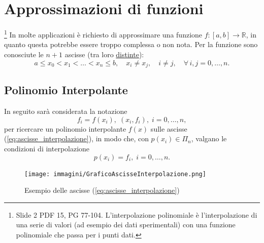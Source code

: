 \section{Approssimazioni di funzioni}
\footnote{Slide 2 PDF 15, PG 77-104. L'interpolazione polinomiale è l'interpolazione di una serie di valori (ad esempio dei dati sperimentali) con una funzione polinomiale che passa per i punti dati.}
In molte applicazioni è richiesto di approssimare una funzione $f:[a,b]\rightarrow\mathbb R$, in quanto questa potrebbe essere troppo complessa o non nota. Per la funzione sono conosciute le $n+1$ ascisse (tra loro \underline{distinte}):
\begin{equation}\label{eq:ascisse_interpolazione}
	a\leq x_0<x_1<\hdots<x_n\leq b,\quad x_i\neq x_j, \quad i\neq j, \quad \forall\, i,j=0,\hdots,n.
\end{equation}

\subsection{Polinomio Interpolante}
In seguito sarà considerata la notazione
\begin{equation*}
    f_i=f(x_i),\; (x_i,f_i),\; i=0,\hdots,n,
\end{equation*}
per ricercare un polinomio interpolante $f(x)$ sulle ascisse (\ref{eq:ascisse_interpolazione}), in modo che, con $p(x_i)\in \Pi_n$, valgano le condizioni di interpolazione 
\begin{equation}\label{eq:condizioni_interpolazione}
    p(x_i)=f_i,\; i=0,\hdots,n.
\end{equation}

\begin{figure}
\centering
\texttt{[image: immagini/GraficoAscisseInterpolazione.png]}
\caption{\label{fig:GraficoAscisseInterp} Esempio delle ascisse (\ref{eq:ascisse_interpolazione})}
\end{figure}

